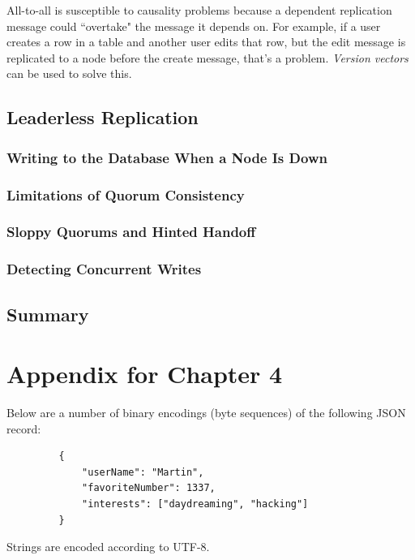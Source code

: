 \documentclass[12pt, titlepage]{article}
\begin{document}
All-to-all is susceptible to causality problems because a dependent replication message could ``overtake" the message it depends on. For example, if a user creates a row in a table and another user edits that row, but the edit message is replicated to a node before the create message, that's a problem. \textit{Version vectors} can be used to solve this.

\subsection{Leaderless Replication}

\subsubsection{Writing to the Database When a Node Is Down}

\subsubsection{Limitations of Quorum Consistency}

\subsubsection{Sloppy Quorums and Hinted Handoff}

\subsubsection{Detecting Concurrent Writes}

\subsection{Summary}

\newpage
\appendix

\section{Appendix for Chapter 4}

Below are a number of binary encodings (byte sequences) of the following JSON record:

\begin{verbatim}
         {
             "userName": "Martin",
             "favoriteNumber": 1337,
             "interests": ["daydreaming", "hacking"]
         }
\end{verbatim}

Strings are encoded according to UTF-8.
\end{document}
